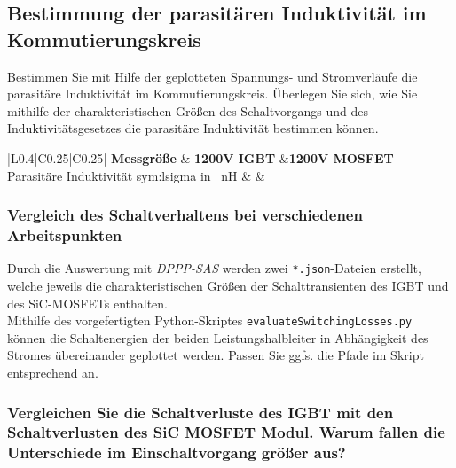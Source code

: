 \hrulefill

\hrulefill

\subsection{Bestimmung der parasitären Induktivität im Kommutierungskreis}
Bestimmen Sie mit Hilfe der geplotteten Spannungs- und Stromverläufe die parasitäre Induktivität im Kommutierungskreis. 
Überlegen Sie sich, wie Sie mithilfe der charakteristischen Größen des Schaltvorgangs und des Induktivitätsgesetzes
die parasitäre Induktivität bestimmen können.

\hrulefill

\hrulefill

\begin{table}[htb]
	\centering
	\label{tab:lsigma}
	\begin{tabular}{|L{0.4\textwidth}|C{0.25\textwidth}|C{0.25\textwidth}|}
		\hline
		\textbf{Messgröße} & \textbf{1200V IGBT} &\textbf{1200V MOSFET} \\
		\hline
		Parasitäre Induktivität \gls{sym:lsigma} in \SI{}{\nano\henry} &  &  \\
		\hline
	\end{tabular}  
\end{table}

\subsubsection{Vergleich des Schaltverhaltens bei verschiedenen Arbeitspunkten}
Durch die Auswertung mit \textit{DPPP-SAS} werden zwei \verb|*.json|-Dateien erstellt,
welche jeweils die charakteristischen Größen der Schalttransienten des IGBT und des SiC-MOSFETs enthalten. \\
Mithilfe des vorgefertigten Python-Skriptes \verb|evaluateSwitchingLosses.py| können die Schaltenergien der beiden Leistungshalbleiter
in Abhängigkeit des Stromes übereinander geplottet werden. Passen Sie ggfs. die Pfade im Skript
entsprechend an.

\subsubsection{Vergleichen Sie die Schaltverluste des IGBT mit den Schaltverlusten des SiC MOSFET Modul. Warum fallen die Unterschiede im Einschaltvorgang größer aus?}

\hrulefill


